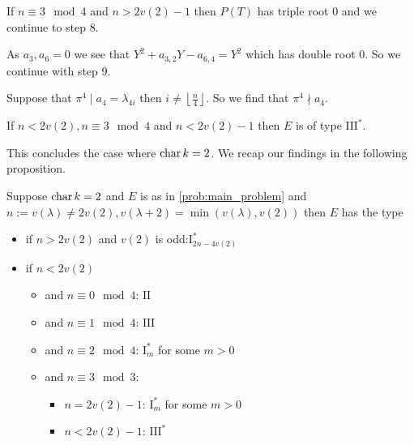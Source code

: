 If  $n \equiv 3 \mod 4$ and $n > 2v(2) - 1$ then $P(T)$ has triple root $0$ and we continue to step 8.

As $a_3, a_6 = 0$ we see that $Y^2 + a_{3,2} Y - a_{6, 4} = Y^2 $ which has double root $0$. 
So we continue with step 9. 

Suppose that $ \pi^{4} \mid a_4 = \lambda_{4i}$ then $i \ne \left\lfloor \frac{n}{4} \right\rfloor$.
So we find that $\pi^{4} \nmid a_4$. 
\begin{tateconclusion}
	If $n < 2v(2), n\equiv 3 \mod 4$ and $n < 2v(2) - 1$ then $E$ is of type $\mathrm{III}^*$. 
\end{tateconclusion}

This concludes the case where $\operatorname{char} k = 2$. 
We recap our findings in the following proposition.

\begin{proposition}\label{prop:tate_char_is_2}
	Suppose $\operatorname{char} k = 2$ and $E$ is as in \cref{prob:main_problem} and $n:= v(\lambda) \ne 2v(2), v(\lambda + 2) = \min(v(\lambda), v(2))$
	then $E$ has the type
	\begin{itemize}
		\item if $n > 2v(2)$ and $v(2)$ is odd:$\mathrm I_{2n - 4v(2)}^*$
		\item if $n < 2v(2)$ 
			\begin{itemize}
				\item and $n \equiv 0 \mod 4$:  $\mathrm {II}$
				\item and  $n \equiv 1 \mod 4$:  $\mathrm {III}$
				\item and $n \equiv 2 \mod 4$:  $\mathrm I^*_m$ for some $m > 0$
				\item and $n\equiv 3 \mod 3$: 
					\begin{itemize}
						\item $n = 2v(2) - 1$:  $\mathrm I_m^*$ for some $m > 0$ 
						\item $n < 2v(2) - 1$: $\mathrm {III}^*$
					\end{itemize}
			\end{itemize}
	\end{itemize}
\end{proposition}

